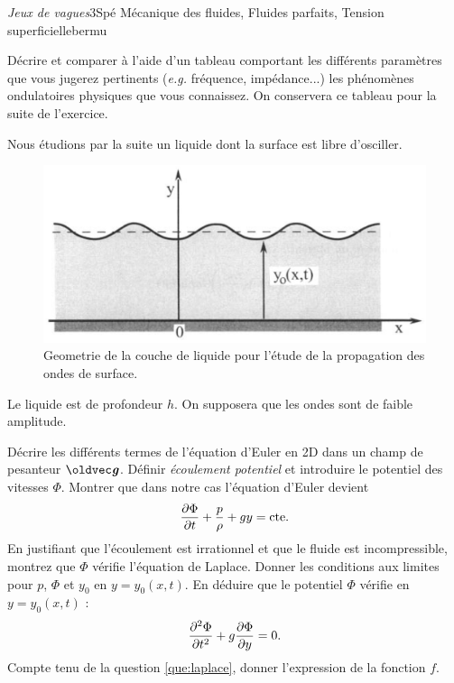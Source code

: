 
\begin{exercise}{\textit{Jeux de vagues}}{3}{Spé}
{Mécanique des fluides, Fluides parfaits, Tension superficielle}{bermu}

\begin{questions}
    \questioncours Décrire et comparer à l'aide d'un tableau comportant les différents paramètres que vous jugerez pertinents (\emph{e.g.} fréquence, impédance...) les phénomènes ondulatoires physiques que vous connaissez. On conservera ce tableau pour la suite de l'exercice. \label{que:ondes}
\begin{EnvUplevel}
Nous étudions par la suite un liquide dont la surface est libre d'osciller.
\begin{figure}[H]
    \centering
    \includegraphics[width=0.5\linewidth]{mecaflu/barque.png}
    \vspace{-1.5em}
    \caption{Geometrie de la couche de liquide pour l'étude de la propagation
des ondes de surface.}
\end{figure}
Le liquide est de profondeur $h$. On supposera que les ondes sont de faible amplitude.
\end{EnvUplevel}
    \question Décrire les différents termes de l'équation d'Euler en 2D dans un champ de pesanteur $\vg$. Définir \emph{écoulement potentiel} et introduire le potentiel des vitesses $\Phi$.
    \question Montrer que dans notre cas l'équation d'Euler devient
    $$\pdv{\Phi}{t} + \dfrac{p}{\rho} + g y = \text{cte}.$$
    \question\label{que:laplace} En justifiant que l'écoulement est irrationnel et que le fluide est incompressible, montrez que $\Phi$ vérifie l'équation de Laplace.
    \question\label{que:inter} Donner les conditions aux limites pour $p$, $\Phi$ et $y_0$ en $y = y_0(x,t)$.
    \question\label{que:kelvin} En déduire que le potentiel $\Phi$ vérifie en $y = y_0(x,t)$ :
    $$\pdv[2]{\Phi}{t} + g\pdv{\Phi}{y} = 0.\vspace{-1.5em}$$
    \question Compte tenu de la question \ref{que:laplace}, donner l'expression de la fonction $f$.

\end{questions}
\end{exercise}
